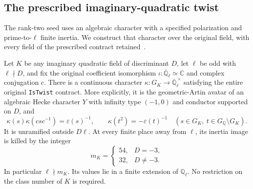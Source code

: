\subsection{The prescribed imaginary-quadratic twist}
\label{sec:actual-cm-twist}

The rank-two seed uses an algebraic character with a specified
polarization and prime-to-$\ell$ finite inertia.  We construct that
character over the original field, with every field of the prescribed
contract retained~\cite{cm-twist-source}.

\begin{theorem}\label{thm:actual-cm-twist}
Let $K$ be any imaginary quadratic field of discriminant $D$, let
$\ell$ be odd with $\ell\nmid D$, and fix the original coefficient
isomorphism $\iota:\overline{\mathbb Q}_\ell\simeq\mathbb C$ and
complex conjugation $c$.  There is a continuous character
$\kappa:G_K\to\overline{\mathbb Q}_\ell^{\,\times}$ satisfying the
entire original \texttt{IsTwist} contract.  More explicitly, it is the
geometric-Artin avatar of an algebraic Hecke character $Y$ with
infinity type $(-1,0)$ and conductor supported on $D$, and
\[
 \kappa(s)\kappa(csc^{-1})=\varepsilon(s)^{-1},\qquad
 \kappa(t^2)=-\varepsilon(t)^{-1}
       \quad(s\in G_K,\ t\in G_{\mathbb Q}\setminus G_K).
\]
It is unramified outside $D\ell$.  At every finite place away from
$\ell$, its inertia image is killed by the integer
\[
 m_K=\begin{cases}54,&D=-3,\\32,&D\ne-3.\end{cases}
\]
In particular $\ell\nmid m_K$.  Its values lie in a finite extension
of $\mathbb Q_\ell$.  No restriction on the class number of $K$ is
required.
\end{theorem}

